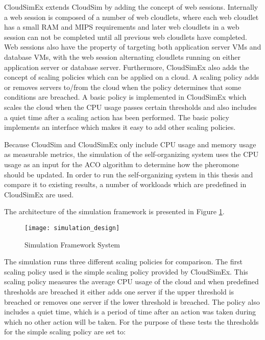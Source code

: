 CloudSimEx extends CloudSim by adding the concept of web sessions. Internally a web session is composed of a number of web cloudlets, where each web cloudlet has a small RAM and MIPS requirements and later web cloudlets in a web session can not be completed until all previous web cloudlets have completed. Web sessions also have the property of targeting both application server VMs and database VMs, with the web session alternating cloudlets running on either application server or database server. Furthermore, CloudSimEx also adds the concept of scaling policies which can be applied on a cloud. A scaling policy adds or removes servers to/from the cloud when the policy determines that some conditions are breached. A basic policy is implemented in CloudSimEx which scales the cloud when the CPU usage passes certain thresholds and also includes a quiet time after a scaling action has been performed. The basic policy implements an interface which makes it easy to add other scaling policies. 

Because CloudSim and CloudSimEx only include CPU usage and memory usage as measurable metrics, the simulation of the self-organizing system uses the CPU usage as an input for the ACO algorithm to determine how the pheromone should be updated. In order to run the self-organizing system in this thesis and compare it to existing results, a number of workloads which are predefined in CloudSimEx are used.

The architecture of the simulation framework is presented in Figure \ref{fig:simulation-design}.


\begin{figure}
	\centering
	\texttt{[image: simulation\_design]}
	\caption{Simulation Framework System}
	\label{fig:simulation-design}
\end{figure}


The simulation runs three different scaling policies for comparison. The first scaling policy used is the simple scaling policy provided by CloudSimEx. This scaling policy measures the average CPU usage of the cloud and when predefined thresholds are breached it either adds one server if the upper threshold is breached or removes one server if the lower threshold is breached. The policy also includes a quiet time, which is a period of time after an action was taken during which no other action will be taken. For the purpose of these tests the thresholds for the simple scaling policy are set to:

